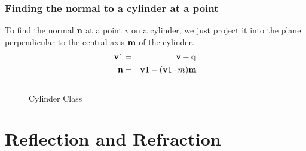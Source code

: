 \documentclass{book}
\newcommand{\vect}[1]{{\bf{ #1}}}
\begin{document}
\subsection{Finding the normal to a cylinder at a point}
To find the normal ${\vect n}$ at a point $v$ on a cylinder, we just project it into the plane
perpendicular to the central axis ${\vect m}$ of the cylinder.
\begin{eqnarray*}
{\vect v}1 &=& {\vect v} - {\vect q} \\
{\vect n} &=&  {\vect v}1 - ({\vect v}1 \cdot m) {\vect m}
\end{eqnarray*}


\begin{figure}
\begin{verbatim}

\end{verbatim}
\caption{Cylinder Class \label{fig:CylinderClass}}
\end{figure}







\chapter{Reflection and Refraction}
\end{document}
